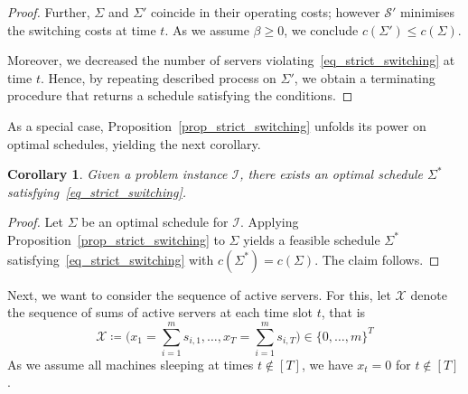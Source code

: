 \documentclass[hidelinks]{article}
\theoremstyle{plain}
\newtheorem{cor}[thm]{Corollary}
\theoremstyle{definition}
\theoremstyle{rem}
\newcommand{\mx}{\mathcal{X}}
\newcommand{\inp}{\mathcal{I}}
\newcommand{\costs}{c}
\newcommand{\fromto}[2]{\{#1,\ldots,#2\}}
\begin{document}
\begin{proof}
Further, $\Sigma$ and $\Sigma'$ coincide in their operating costs; however $\mathcal{S}'$ minimises the switching costs at time $t$. As we assume $\beta\ge0$, we conclude $\costs(\Sigma')\le \costs(\Sigma)$.

Moreover, we decreased the number of servers violating~\eqref{eq_strict_switching} at time $t$. Hence, by repeating described process on $\Sigma'$, we obtain a terminating procedure that returns a schedule satisfying the conditions.
\end{proof}

As a special case, Proposition~\ref{prop_strict_switching} unfolds its power on optimal schedules, yielding the next corollary.
\begin{cor}\label{cor_strict_opt_schedule}
Given a problem instance $\inp$, there exists an optimal schedule $\Sigma^*$ satisfying~\eqref{eq_strict_switching}.
\end{cor}
\begin{proof}
Let $\Sigma$ be an optimal schedule for $\inp$. Applying Proposition~\ref{prop_strict_switching} to $\Sigma$ yields a feasible schedule $\Sigma^*$ satisfying~\eqref{eq_strict_switching} with $\costs(\Sigma^*)=\costs(\Sigma)$. The claim follows.
\end{proof}

Next, we want to consider the sequence of active servers. For this, let $\mx$ denote the sequence of sums of active servers at each time slot $t$, that is
\begin{equation*}
	\mx\coloneqq\bigl(x_1=\sum\limits_{i=1}^{m}s_{i,1},\ldots,x_T=\sum\limits_{i=1}^{m}s_{i,T}\bigr)\in\fromto{0}{m}^T
\end{equation*}
As we assume all machines sleeping at times $t\notin[T]$, we have $x_t=0$ for $t\notin[T]$.
\end{document}
